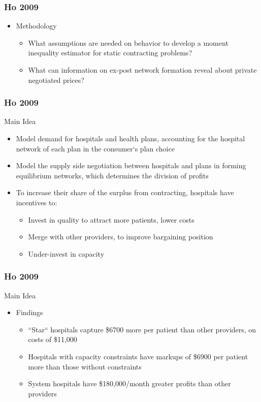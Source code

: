 \documentclass[notes=show]{beamer}
\begin{document}

\begin{frame}
\frametitle{Ho 2009}

\begin{itemize}
	\item Methodology
	\begin{itemize}
	\item What assumptions are needed on behavior to develop a moment inequality estimator for static contracting problems?
	\item What can information on ex-post network formation reveal about private negotiated prices?
	\end{itemize}
\end{itemize}
\end{frame}


\begin{frame}
\frametitle{Ho 2009}

Main Idea
\begin{itemize}
	\item Model demand for hospitals and health plans, accounting for the hospital network of each plan in the consumer`s plan choice
	\item Model the supply side negotiation between hospitals and plans in forming equilibrium networks, which determines the division of profits
        \item To increase their share of the surplus from contracting, hospitals have incentives to:
         \begin{itemize}
	\item Invest in quality to attract more patients, lower costs
	\item Merge with other providers, to improve bargaining position
	\item Under-invest in capacity
	\end{itemize}
\end{itemize}
\end{frame}


\begin{frame}
\frametitle{Ho 2009}

Main Idea
\begin{itemize}
\item Findings
\begin{itemize}
\item ``Star`` hospitals capture \$6700 more per patient than other providers, on costs of \$11,000
\item Hospitals with capacity constraints have markups of \$6900 per patient more than those without constraints
\item System hospitals have \$180,000/month greater profits than other providers
\end{itemize}
\end{itemize}
\end{frame}
\end{document}
